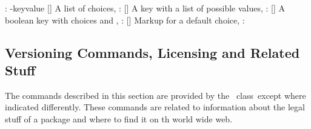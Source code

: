 \documentclass[load-preamble]{cnltx-doc}
\begin{document}
\begin{commands}
    \code{-}: \key-{key}{value}
  []
    A list of choices, :
  []
    A key  with a list of possible values,
    :
  []
    A boolean key  with choices  and ,
    : 
  []
    Markup for a default choice,
    :
\end{commands}


\subsection{Versioning Commands, Licensing and Related  Stuff}\label{sec:cmds:versioning}

The commands described in this section are provided by the \cnltx\
class\byclass\ except where indicated differently.  These commands are related
to information about the legal stuff of a package and where to find it on th
world wide web.
\end{document}
